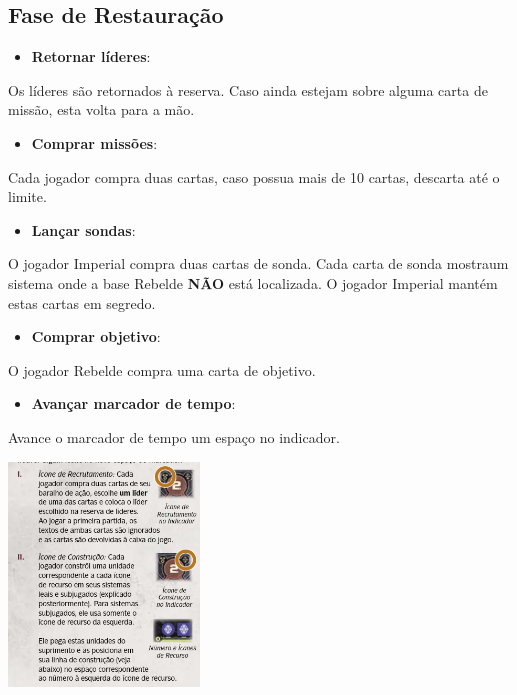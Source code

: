 \documentclass[11pt]{article}
\begin{document}
\subsection{Fase de Restauração}
\label{sec:orgd57f995}

\begin{itemize}
\item \textbf{Retornar líderes}:
\end{itemize}

Os líderes são retornados à reserva. Caso ainda estejam sobre alguma carta de missão, esta volta para a mão.

\begin{itemize}
\item \textbf{Comprar missões}:
\end{itemize}

Cada jogador compra duas cartas, caso possua mais de 10 cartas, descarta até o limite.

\begin{itemize}
\item \textbf{Lançar sondas}:
\end{itemize}

O jogador Imperial compra duas cartas de sonda. Cada carta de sonda mostraum sistema onde a base Rebelde \textbf{NÃO} está localizada. O jogador Imperial mantém estas cartas em segredo.

\begin{itemize}
\item \textbf{Comprar objetivo}:
\end{itemize}

O jogador Rebelde compra uma carta de objetivo.

\begin{itemize}
\item \textbf{Avançar marcador de tempo}:
\end{itemize}

Avance o marcador de tempo um espaço no indicador.

\begin{center}
\includegraphics[width=2.0in]{./time-marker.png}
\end{center}
\end{document}
